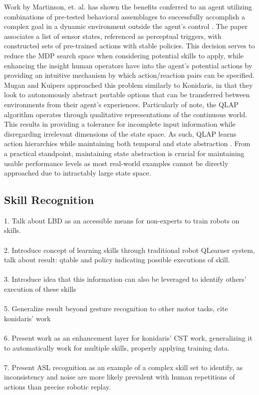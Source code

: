 \documentclass[letterpaper]{article}
\begin{document}
Work by Martinson, et. al. has shown the benefits conferred to an agent utilizing combinations of pre-tested behavioral assemblages to successfully accomplish a complex goal in a dynamic environment outside the agent's control \cite{QLBehaviorSelection}. The paper associates a list of sensor states, referenced as perceptual triggers, with constructed sets of pre-trained actions with stable policies. This decision serves to reduce the MDP search space when considering potential skills to apply, while enhancing the insight human operators have into the agent's potential actions by providing an intuitive mechanism by which action/reaction pairs can be specified. Mugan and Kuipers approached this problem similarly to Konidaris, in that they look to autonomously abstract portable options that can be transferred between environments from their agent's experiences. Particularly of note, the QLAP algorithm operates through qualitative representations of the continuous world. This results in providing a tolerance for incomplete input information while disregarding irrelevant dimensions of the state space. As such, QLAP learns action hierarchies while maintaining both temporal and state abstraction \cite{AutoHierarchyLearning}. From a practical standpoint, maintaining state abstraction is crucial for maintaining usable performance levels as most real-world examples cannot be directly approached due to intractably large state space.


\subsection{Skill Recognition}
1. Talk about LBD as an accessible means for non-experts to train robots on skills.\\
\\
2. Introduce concept of learning skills through traditional robot QLearner system, talk about
   result: qtable and policy indicating possible executions of skill.\\
\\
3. Introduce idea that this information can also be leveraged to identify others' execution of these skills\\
\\
5. Generalize result beyond gesture recognition to other motor tasks, cite konidaris' work\\
\\
6. Present work as an enhancement layer for konidaris' CST work, generalizing it to automatically work for
 multiple skills, properly applying training data.\\
\\
7. Present ASL recognition as an example of a complex skill set to identify, as inconsistency and noise
   are more likely prevalent with human repetitions of actions than precise robotic replay.\\
\\
\end{document}
